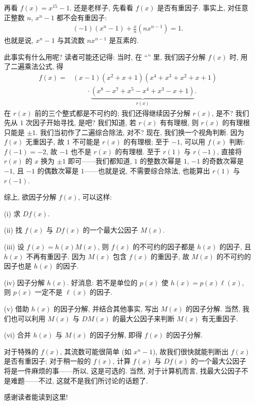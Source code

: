 \begin{example}
    再看 $f(x) = x^{15} - 1$. 还是老样子, 先看看 $f(x)$ 是否有重因子. 事实上, 对任意正整数 $n$, $x^n - 1$ 都不会有重因子:
    \begin{align*}
        (-1) (x^n - 1) + \frac{x}{n} (nx^{n-1}) = 1.
    \end{align*}
    也就是说, $x^n - 1$ 与其流数 $nx^{n-1}$ 是互素的.

    此事实有什么用呢? 读者可能还记得: 当时, 在 ``\FactorsOfHigherDegreeOfPolynomialsOverQ'' 里, 我们因子分解 $f(x)$ 时, 用了二遍乘法公式, 得
    \begin{align*}
        f(x)
        = {} & (x-1) (x^2+x+1) (x^4+x^3+x^2+x+1)                           \\
             & \qquad \cdot \underbrace{(x^8-x^7+x^5-x^4+x^3-x+1)}_{r(x)}.
    \end{align*}
    在 $r(x)$ 前的三个整式都是不可约的; 我们还得继续因子分解 $r(x)$, 是不? 我们先从 $1$ 次因子开始寻找, 是吧? 我们知道, 若 $r(x)$ 有有理根, 则 $r(x)$ 的有理根只能是 $\pm 1$. 我们当初作了二遍综合除法, 对不? 现在, 我们换一个视角判断. 因为 $f(x)$ 无重因子, 故 $1$ 不可能是 $r(x)$ 的有理根; 至于 $-1$, 可以用 $f(x)$ 判断: $f(-1) = -2$, 故 $-1$ 也不是 $r(x)$ 的有理根. 至于 $r(1)$ 与 $r(-1)$, 直接将 $r(x)$ 的 $x$ 换为 $\pm 1$ 即可——我们都知道, $1$ 的整数次幂是 $1$, $-1$ 的奇数次幂是 $-1$, 且 $-1$ 的偶数次幂是 $1$——也就是说, 不需要综合除法, 也能算出 $r(1)$ 与 $r(-1)$.
\end{example}

综上, 欲因子分解 $f(x)$, 可以这样:

(i) 求 $Df(x)$.

(ii) 找 $f(x)$ 与 $Df(x)$ 的一个最大公因子 $M(x)$.

(iii) 设 $f(x) = h(x) M(x)$, 则 $f(x)$ 的不可约的因子都是 $h(x)$ 的因子, 且 $h(x)$ 不再有重因子. 因为 $M(x)$ 包含 $f(x)$ 的重因子, 故 $M(x)$ 的不可约的因子也是 $h(x)$ 的因子.

(iv) 因子分解 $h(x)$. 好消息: 若不是单位的 $p(x)$ 使 $h(x) = p(x) \ell(x)$, 则 $p(x)$ 一定不是 $\ell (x)$ 的因子.

(v) 借助 $h(x)$ 的因子分解, 并结合其他事实, 写出 $M(x)$ 的因子分解. 当然, 我们也可以利用 $M(x)$ 与 $DM(x)$ 的最大公因子来判断 $M(x)$ 有无重因子.

(vi) 合并 $h(x)$ 与 $M(x)$ 的因子分解, 即得 $f(x)$ 的因子分解.

对于特殊的 $f(x)$, 其流数可能很简单 (如 $x^n - 1$), 故我们很快就能判断出 $f(x)$ 是否有重因子; 对于稍一般的 $f(x)$, 计算 $f(x)$ 与 $Df(x)$ 的一个最大公因子将是一件麻烦的事——所以, 这是可选的. 当然, 对于计算机而言, 找最大公因子不是难题——不过, 这就不是我们所讨论的话题了.

感谢读者能读到这里!
